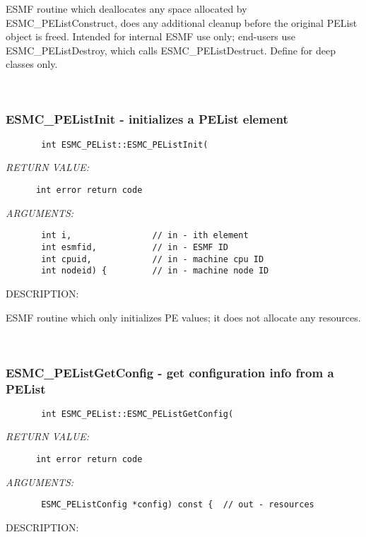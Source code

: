         ESMF routine which deallocates any space allocated by
        ESMC\_PEListConstruct, does any additional cleanup before the
        original PEList object is freed.  Intended for internal ESMF
        use only; end-users use ESMC\_PEListDestroy, which calls
        ESMC\_PEListDestruct.  Define for deep classes only.
   
 
\mbox{}\hrulefill\ 
 
\subsubsection{ESMC\_PEListInit - initializes a PEList element}


  
\begin{verbatim}       int ESMC_PEList::ESMC_PEListInit(\end{verbatim}{\em RETURN VALUE:}
\begin{verbatim}      int error return code\end{verbatim}{\em ARGUMENTS:}
\begin{verbatim}       int i,                // in - ith element
       int esmfid,           // in - ESMF ID
       int cpuid,            // in - machine cpu ID
       int nodeid) {         // in - machine node ID\end{verbatim}
{\sf DESCRIPTION:\\ }


        ESMF routine which only initializes PE values; it does not
        allocate any resources.
   
 
\mbox{}\hrulefill\ 
 
\subsubsection{ESMC\_PEListGetConfig - get configuration info from a PEList}


  
\begin{verbatim}       int ESMC_PEList::ESMC_PEListGetConfig(\end{verbatim}{\em RETURN VALUE:}
\begin{verbatim}      int error return code\end{verbatim}{\em ARGUMENTS:}
\begin{verbatim}       ESMC_PEListConfig *config) const {  // out - resources\end{verbatim}
{\sf DESCRIPTION:\\ }


